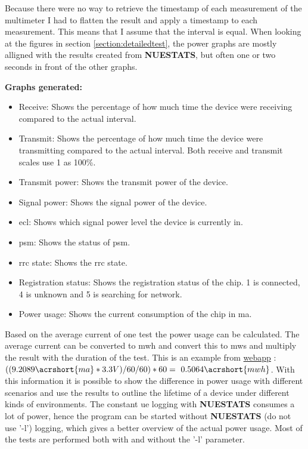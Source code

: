 \documentclass[USenglish]{ifimaster}  %
\begin{document}
Because there were no way to retrieve the timestamp of each measurement of the multimeter I had to flatten the result and apply a timestamp to each measurement. This means that I assume that the interval is equal. When looking at the figures in section \vref{section:detailedtest}, the power graphs are mostly alligned with the results created from \textbf{NUESTATS}, but often one or two seconds in front of the other graphs.

\textbf{Graphs generated:}
\begin{itemize}
  \item Receive: Shows the percentage of how much time the device were receiving compared to the actual interval.
  \item Transmit: Shows the percentage of how much time the device were transmitting compared to the actual interval. Both receive and transmit scales use 1 as 100\%.
  \item Transmit power: Shows the transmit power of the device.
  \item Signal power: Shows the signal power of the device.
  \item \acrshort{ecl}: Shows which signal power level the device is currently in.
  \item \acrshort{psm}: Shows the status of \acrshort{psm}.
  \item \acrshort{rrc} state: Shows the \acrshort{rrc} state.
  \item Registration status: Shows the registration status of the chip. 1 is connected, 4 is unknown and 5 is searching for network.
  \item Power usage: Shows the current consumption of the chip in \acrshort{ma}.
\end{itemize}

Based on the average current of one test the power usage can be calculated. The average current can be converted to \acrshort{mwh} and convert this to \acrshort{mws} and multiply the result with the duration of the test. This is an example from \href{http://158.39.77.97:9000/\#/results/UiO\_TELIA\_5.02\_precision\_2018-03-16\_1\_0x2\_60\_1\_512}{webapp} \cite{webapp:powerexample}: ${( (9.2089 \acrshort{ma} * 3.3V) / 60 / 60 ) * 60 = ~0.5064 \acrshort{mwh}}$. With this information it is possible to show the difference in power usage with different scenarios and use the results to outline the lifetime of a device under different kinds of environments. The constant \acrshort{ue} logging with \textbf{NUESTATS} consumes a lot of power, hence the program can be started without \textbf{NUESTATS} (do not use '-l') logging, which gives a better overview of the actual power usage. Most of the tests are performed both with and without the '-l' parameter.
\end{document}
